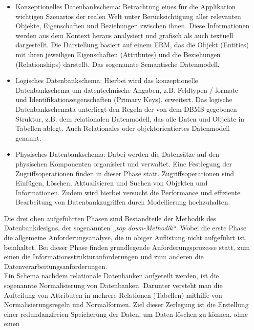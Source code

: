 \begin{itemize}
    \item Konzeptionelles Datenbankschema: Betrachtung eines für die Applikation wichtigen Szenarios der realen Welt unter Berücksichtigung 
    aller relevanten Objekte, Eigenschaften und Beziehungen zwischen ihnen. Diese Informationen werden aus dem Kontext heraus analysiert 
    und grafisch als auch textuell dargestellt. Die Darstellung basiert auf einem \ac{ERM}, das die Objekt (Entities) mit ihren jeweiligen 
    Eigenschaften (Attributes) und die Beziehungen (Relationships) darstellt. Das sogenannte Semantische Datenmodell.
    \item Logisches Datenbankschema: Hierbei wird das konzeptionelle Datenbankschema um datentechnische Angaben, z.B. Feldtypen /-formate 
    und Identifikationseigenschaften (Primary Keys), erweitert. Das logische Datenbankschemata unterliegt den Regeln der von dem \ac{DBMS}
    gegebenen Struktur, z.B. dem relationalen Datenmodell, das alle Daten und Objekte in Tabellen ablegt. Auch Relationales oder 
    objektorientiertes Datenmodell genannt. \cite{datenmodellierung.2019d}
    \item Physisches Datenbankschema: Dabei werden die Datensätze auf den physischen Komponenten organisiert und verwaltet. Eine Festlegung 
    der Zugriffsoperationen finden in dieser Phase statt. Zugriffsoperationen sind Einfügen, Löschen, Aktualisieren und Suchen von Objekten 
    und Informationen. Zudem wird hierbei versucht die Performance und effiziente Bearbeitung von Datenbankzugriffen durch Modellierung hochzuhalten.
\end{itemize}  
Die drei oben aufgeführten Phasen sind Bestandteile der Methodik des Datenbankdesigns, der sogenannten \textit{„top down-Methodik“}. 
Wobei die erste Phase die allgemeine Anforderungsanalyse, die in obiger Auflistung nicht aufgeführt ist, beinhaltet. Bei dieser Phase finden 
grundlegende Anforderungsprozesse statt, zum einen die Informationsstrukturanforderungen und zum anderen die Datenverarbeitungsanforderungen. 
\\ 
\linebreak
Ein Schema nachdem relationale Datenbanken aufgeteilt werden, ist die sogenannte Normalisierung von Datenbanken. Darunter versteht man die 
Aufteilung von Attributen in mehrere Relationen (Tabellen) mithilfe von Normalisierungsregeln und Normalformen. \cite{normalisierung.2020j} 
Ziel dieser Zerlegung ist die Erstellung einer redundanzfreien Speicherung der Daten, um Daten löschen zu können, ohne einen 
